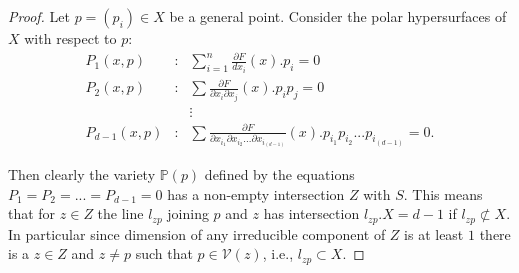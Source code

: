 \documentclass[10pt,a4paper]{amsart}
\begin{document}
\begin{proof} Let $p=(p_i)\in X$ be a general point.
Consider the polar hypersurfaces of $X$ with respect to $p$:
\begin{eqnarray*}
P_1(x,p) & : &\sum_{i=1}^n\frac{\partial{F}}{dx_i}(x).p_i=0 \\
P_2(x,p) & : & \sum\frac{\partial{F}}{\partial{x_i}\partial{x_j}}(x).p_ip_j=0 \\
&& \vdots \\
P_{d-1}(x,p)& : &\sum \frac{\partial{F}}{\partial{x_{i_1}}\partial{x_{i_2}}...\partial{x_{i_{(d-1)}}}}(x).p_{i_1}p_{i_2}...p_{i_{(d-1)}}=0.
\end{eqnarray*}

Then clearly the variety $\mathbb{P}(p)$ defined by the equations 
$P_1=P_2=...=P_{d-1}=0$ 
has a non-empty intersection $Z$ with $S$. This means that for $z\in Z$ the 
line 
$l_{zp}$ joining $p$ and $z$ has intersection $l_{zp}.X=d-1$ if $l_{zp}\not\subset X$. 
 In particular since dimension of any irreducible component of $Z$ is at least $1$ there is a $z\in Z$ and $z\neq p$
such that $p\in \mathcal{V}(z)$, i.e., $l_{zp}\subset X$. 
\end{proof}
\end{document}
